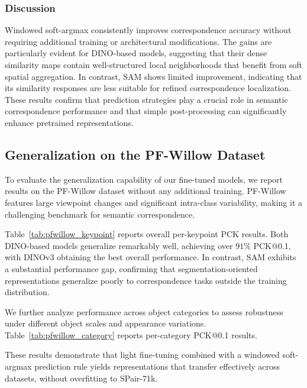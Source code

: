 \subsubsection{Discussion}

Windowed soft-argmax consistently improves correspondence accuracy without requiring additional training or architectural modifications.
The gains are particularly evident for DINO-based models, suggesting that their dense similarity maps contain well-structured local neighborhoods
that benefit from soft spatial aggregation.
In contrast, SAM shows limited improvement, indicating that its similarity responses are less suitable for refined correspondence localization.
These results confirm that prediction strategies play a crucial role in semantic correspondence performance and that simple post-processing can
significantly enhance pretrained representations.




\subsection{Generalization on the PF-Willow Dataset}

To evaluate the generalization capability of our fine-tuned models, we report results on the PF-Willow dataset without any additional training.
PF-Willow features large viewpoint changes and significant intra-class variability, making it a challenging benchmark for semantic correspondence.

Table~\ref{tab:pfwillow_keypoint} reports overall per-keypoint PCK results.
Both DINO-based models generalize remarkably well, achieving over $91\%$ PCK@0.1, with DINOv3 obtaining the best overall performance.
In contrast, SAM exhibits a substantial performance gap, confirming that segmentation-oriented representations generalize poorly to correspondence
tasks outside the training distribution.

We further analyze performance across object categories to assess robustness under different object scales and appearance variations.
Table~\ref{tab:pfwillow_category} reports per-category PCK@0.1 results.

These results demonstrate that light fine-tuning combined with a windowed soft-argmax prediction rule yields representations that transfer effectively
across datasets, without overfitting to SPair-71k.


